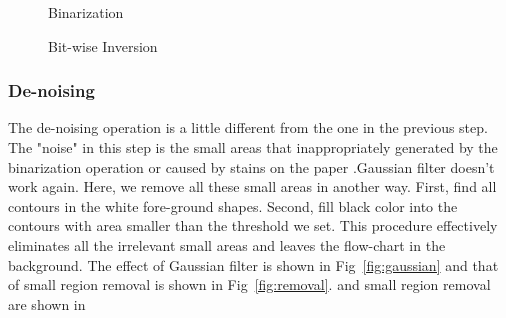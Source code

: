\documentclass[conference,twocolumn]{IEEEtran}
\begin{document}
\begin{figure}[!htbp]
    \centering
    \caption{Binarization}
    \label{fig:binarization}
\end{figure}


\begin{figure}[!htbp]
    \centering
    \caption{Bit-wise Inversion}
    \label{fig:bitwise}
\end{figure}




\subsubsection{De-noising}
The de-noising operation is a little different from the one in the previous step. The "noise" in this step is the small areas that inappropriately generated by the binarization operation or caused by stains on the paper .Gaussian filter doesn't work again. Here, we remove all these small areas in another way. First, find all contours in the white fore-ground shapes. Second, fill black color into the contours with area smaller than the threshold we set. This procedure effectively eliminates all the irrelevant small areas and leaves the flow-chart in the background. The effect of Gaussian filter is shown in Fig~\ref{fig:gaussian} and that of small region removal is shown in Fig~\ref{fig:removal}.
and small region removal are shown in 
\end{document}

